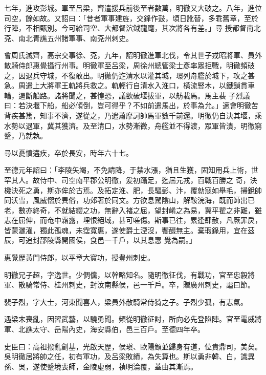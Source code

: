 \begin{pinyinscope}
 七年，進攻彭城。軍至呂梁，齊遣援兵前後至者數萬，明徹又大破之。八年，進位司空，餘如故。又詔曰：「昔者軍事建旌，交鋒作鼓，頃日訛替，多乖舊章，至於行陣，不相甄別。今可給司空、大都督泬鉞龍麾，其次將各有差。」尋
 授都督南北兗、南北青譙五州諸軍事、南兗州刺史。



 會周氏滅齊，高宗交事徐、兗，九年，詔明徹進軍北伐，令其世子戎昭將軍、員外散騎侍郎惠覺攝行州事。明徹軍至呂梁，周徐州總管梁士彥率眾拒戰，明徹頻破之，因退兵守城，不復敢出。明徹仍迮清水以灌其城，環列舟艦於城下，攻之甚急。周遣上大將軍王軌將兵救之。軌輕行自清水入淮口，橫流豎木，以鐵鎖貫車輪，遏斷船路。諸將聞之，甚惶恐，議欲破堰拔軍，以舫載馬。馬主裴
 子烈議曰：若決堰下船，船必傾倒，豈可得乎？不如前遣馬出，於事為允。」適會明徹苦背疾甚篤，知事不濟，遂從之，乃遣蕭摩訶帥馬軍數千前還。明徹仍自決其堰，乘水勢以退軍，冀其獲濟。及至清口，水勢漸微，舟艦並不得渡，眾軍皆潰，明徹窮蹙，乃就執。



 尋以憂憤遘疾，卒於長安，時年六十七。



 至德元年詔曰：「李陵矢竭，不免請降，于禁水漲，猶且生獲，固知用兵上術，世罕其人。故侍中、司空南平郡公明徹，爰初躡足，迄屆元戎，百戰百勝之
 奇，決機決死之勇，斯亦侔於古焉。及拓定淮、肥，長驅彭、汴，覆勍寇如舉毛，掃銳帥同沃雪，風威慴於異俗，功郊著於同文。方欲息駕陰山，解鞍浣海，既而師出已老，數亦終奇，不就結纓之功，無辭入褚之屈，望封崤之為易，冀平翟之非難，雖志在屈伸，而奄中霜露，埋恨絕域，甚可嗟傷。斯事已往，累逢肆赦，凡厥罪戾，皆蒙灑濯，獨此孤魂，未霑寬惠，遂使爵土湮沒，饗醊無主。棄瑕錄用，宜在茲辰，可追封邵陵縣開國侯，食邑一千戶，以其息惠
 覺為嗣。」



 惠覺歷黃門侍郎，以平章大寶功，授豊州刺史。



 明徹兄子超，字逸世。少倜儻，以幹略知名。隨明徹征伐，有戰功，官至忠毅將軍、散騎常侍、桂州刺史，封汝南縣侯，邑一千戶。卒，贈廣州刺史，謚曰節。



 裴子烈，字大士，河東聞喜人，梁員外散騎常侍猗之子。子烈少孤，有志氣。



 遇梁末喪亂，因習武藝，以驍勇聞。頻從明徹征討，所向必先登陷陣。官至電威將軍、北譙太守、岳陽內史，海安縣伯，邑三百戶。至德四年卒。



 史臣曰：高祖撥亂創基，光啟天歷，侯瑱、歐陽頠並歸身有道，位貴鼎司，美矣。吳明徹居將帥之任，初有軍功，及呂梁敗績，為失算也。斯以勇非韓、白，識異孫、吳，遂使蹙境喪師，金陵虛弱，禎明淪覆，蓋由其漸焉。



\end{pinyinscope}